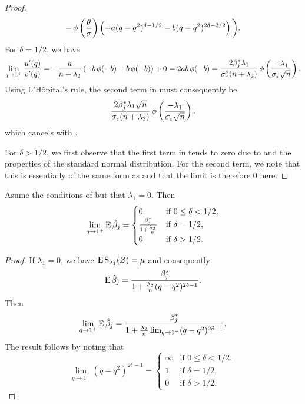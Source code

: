 \begin{proof}
\begin{multline}
    - \operatorname{\phi}\left(\frac{\theta}{\sigma}\right) \left(-a(q - q^2)^{\delta - 1/2} - b(q - q^2)^{2\delta - 3/2}\right) \bigg).
  \end{multline}
  For \(\delta = 1/2\), we have
  \[
    \lim_{q \rightarrow 1^+} \frac{u'(q)}{v'(q)} = -\frac{a}{n + \lambda_2}\left(-b \operatorname{\phi}(-b) - b \operatorname{\phi}(-b)\right) + 0 = 2ab \operatorname{\phi}(-b) = \frac{2 \beta_j^* \lambda_1}{\sigma_\varepsilon^2(n + \lambda_2)} \operatorname{\phi} \left(\frac{-\lambda_1}{\sigma_\varepsilon\sqrt{n}}\right).
  \]
  Using L'Hôpital's rule, the second term in  must consequently be
  \[
    \frac{2 \beta_j^* \lambda_1\sqrt{n}}{\sigma_\varepsilon(n + \lambda_2)} \operatorname{\phi} \left(\frac{-\lambda_1}{\sigma_\varepsilon\sqrt{n}}\right).
  \]
  which cancels with .

  For \(\delta > 1/2\), we first observe that the first term in  tends to zero due to  and
  the properties of the standard normal distribution. For the second term, we note that this is essentially
  of the same form as  and that the limit is therefore 0 here.
\end{proof}

\begin{corollary}
  Asume the conditions of  but that \(\lambda_1 = 0\). Then
  \[
    \lim_{q \rightarrow 1^+} \operatorname{E} \hat{\beta}_j =
    \begin{cases}
      0                                         & \text{if } 0 \leq \delta < 1/2, \\
      \frac{\beta_j^*}{1 + \frac{\lambda_2}{n}} & \text{if } \delta = 1/2,        \\
      0                                         & \text{if } \delta > 1/2.
    \end{cases}
  \]
\end{corollary}
\begin{proof}
  If \(\lambda_1 = 0\), we have \(\operatorname{E} \operatorname{S}_{\lambda_1}(Z) = \mu\) and consequently
  \[
    \operatorname{E} \hat{\beta}_j = \frac{\beta_j^*}{1 + \frac{\lambda_2}{n} (q - q^2)^{2\delta - 1}}.
  \]
  Then
  \[
    \lim_{q \rightarrow 1^+} \operatorname{E} \hat{\beta}_j = \frac{\beta_j^*}{1 + \frac{\lambda_2}{n}\lim_{q \rightarrow 1^+} (q - q^2)^{2\delta - 1}}.
  \]
  The result follows by noting that
  \[
    \lim_{q \rightarrow 1^+} (q - q^2)^{2\delta - 1} =
    \begin{cases}
      \infty & \text{if } 0 \leq \delta < 1/2, \\
      1      & \text{if } \delta = 1/2,        \\
      0      & \text{if } \delta > 1/2.
    \end{cases}
  \]
\end{proof}


